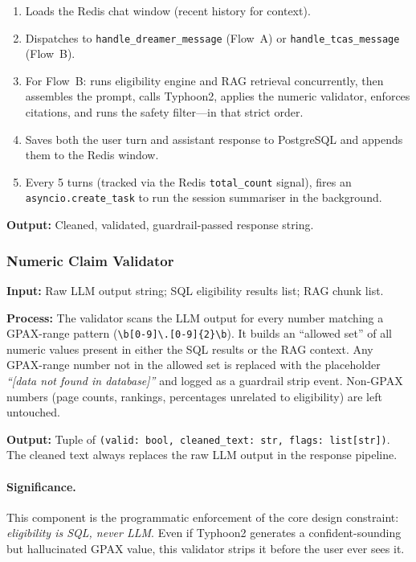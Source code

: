 ﻿\documentclass[12pt,a4paper]{article}
\begin{document}
\begin{enumerate}
    \item Loads the Redis chat window (recent history for context).
    \item Dispatches to \texttt{handle\_dreamer\_message} (Flow~A) or
    \texttt{handle\_tcas\_message} (Flow~B).
    \item For Flow~B: runs eligibility engine and RAG retrieval concurrently, then
    assembles the prompt, calls Typhoon2, applies the numeric validator, enforces
    citations, and runs the safety filter—in that strict order.
    \item Saves both the user turn and assistant response to PostgreSQL and appends
    them to the Redis window.
    \item Every 5 turns (tracked via the Redis \texttt{total\_count} signal), fires
    an \texttt{asyncio.create\_task} to run the session summariser in the background.
\end{enumerate}

\textbf{Output:} Cleaned, validated, guardrail-passed response string.

\subsubsection{Numeric Claim Validator}

\textbf{Input:} Raw LLM output string; SQL eligibility results list; RAG chunk list.

\textbf{Process:} The validator scans the LLM output for every number matching a
GPAX-range pattern (\texttt{\textbackslash b[0-9]\textbackslash.[0-9]\{2\}\textbackslash b}).
It builds an ``allowed set'' of all numeric values present in either the SQL results
or the RAG context. Any GPAX-range number not in the allowed set is replaced with
the placeholder \emph{``[data not found in database]''} and logged as a guardrail strip event. Non-GPAX numbers (page counts,
rankings, percentages unrelated to eligibility) are left untouched.

\textbf{Output:} Tuple of \texttt{(valid: bool, cleaned\_text: str, flags:
list[str])}. The cleaned text always replaces the raw LLM output in the response
pipeline.

\paragraph{Significance.} This component is the programmatic enforcement of the
core design constraint: \emph{eligibility is SQL, never LLM}. Even if Typhoon2
generates a confident-sounding but hallucinated GPAX value, this validator strips it
before the user ever sees it.
\end{document}
